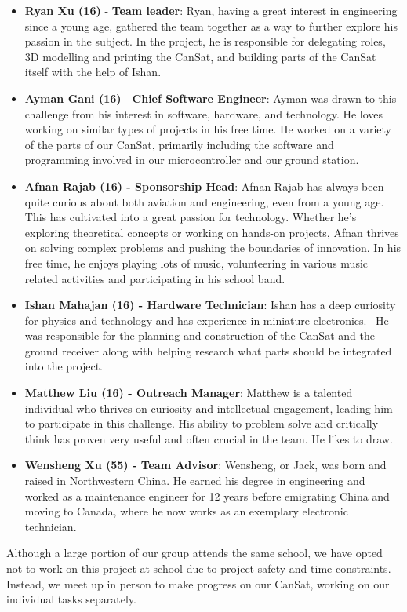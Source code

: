 \documentclass[10pt,twocolumn]{article}
\begin{document}
\begin{itemize}
    \item \textbf{Ryan Xu (16)} -\textbf{ Team leader}: Ryan, having a great interest in engineering since a young age, gathered the team together as a way to further explore his passion in the subject. In the project, he is responsible for delegating roles, 3D modelling and printing the CanSat, and building parts of the CanSat itself with the help of Ishan. 

    \item \textbf{Ayman Gani (16)} - \textbf{Chief Software Engineer}: Ayman was drawn to this challenge from his interest in software, hardware, and technology. He loves working on similar types of projects in his free time. He worked on a variety of the parts of our CanSat, primarily including the software and programming involved in our microcontroller and our ground station.

    \item \textbf{Afnan Rajab (16) - Sponsorship Head}: Afnan Rajab has always been quite curious about both aviation and engineering, even from a young age. This has cultivated into a great passion for technology. Whether he's exploring theoretical concepts or working on hands-on projects, Afnan thrives on solving complex problems and pushing the boundaries of innovation. In his free time, he enjoys playing lots of music, volunteering in various music related activities and participating in his school band.

    \item \textbf{Ishan Mahajan (16) - Hardware Technician}: Ishan has a deep curiosity for physics and technology and has experience in miniature electronics.  He was responsible for the planning and construction of the CanSat and the ground receiver along with helping research what parts should be integrated into the project.

    \item \textbf{Matthew Liu (16) - Outreach Manager}: Matthew is a talented individual who thrives on curiosity and intellectual engagement, leading him to participate in this challenge. His ability to problem solve and critically think has proven very useful and often crucial in the team. He likes to draw.

    \item \textbf{Wensheng Xu (55) - Team Advisor}: Wensheng, or Jack, was born and raised in Northwestern China. He earned his degree in engineering and worked as a maintenance engineer for 12 years before emigrating China and moving to Canada, where he now works as an exemplary electronic technician. 

\end{itemize}
Although a large portion of our group attends the same school, we have opted not to work on this project at school due to project safety and time constraints. Instead, we meet up in person to make progress on our CanSat, working on our individual tasks separately.
\end{document}
